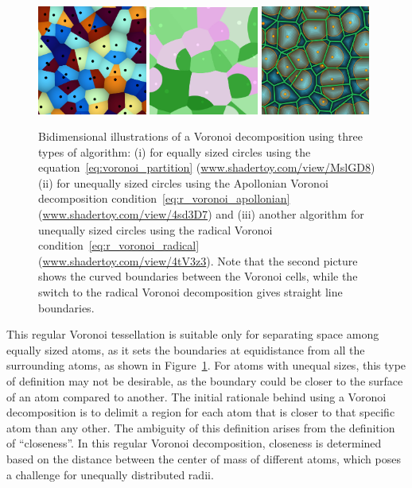 \documentclass[main]{subfiles}
\begin{document}
\begin{figure}[ht]
  \centering
  \includegraphics[width=0.32\textwidth]{figures/3-fastsim/voronoi.jpg}
  \hfill
  \includegraphics[width=0.32\textwidth]{figures/3-fastsim/voronoi_apollonian.jpg}
  \hfill
  \includegraphics[width=0.32\textwidth]{figures/3-fastsim/voronoi_radical.jpg}
  \caption{Bidimensional illustrations of a Voronoi decomposition using three types of algorithm: (i) for equally sized circles using the equation~\ref{eq:voronoi_partition} (\url{www.shadertoy.com/view/MslGD8}) (ii) for unequally sized circles using the Apollonian Voronoi decomposition condition~\ref{eq:r_voronoi_apollonian} (\url{www.shadertoy.com/view/4sd3D7}) and (iii) another algorithm for unequally sized circles using the radical Voronoi condition~\ref{eq:r_voronoi_radical} (\url{www.shadertoy.com/view/4tV3z3}). Note that the second picture shows the curved boundaries between the Voronoi cells, while the switch to the radical Voronoi decomposition gives straight line boundaries.}\label{fgr:voronoi_illustration}
\end{figure}

This regular Voronoi tessellation is suitable only for separating space among equally sized atoms, as it sets the boundaries at equidistance from all the surrounding atoms, as shown in Figure~\ref{fgr:voronoi_illustration}. For atoms with unequal sizes, this type of definition may not be desirable, as the boundary could be closer to the surface of an atom compared to another. The initial rationale behind using a Voronoi decomposition is to delimit a region for each atom that is closer to that specific atom than any other. The ambiguity of this definition arises from the definition of ``closeness''. In this regular Voronoi decomposition, closeness is determined based on the distance between the center of mass of different atoms, which poses a challenge for unequally distributed radii.
\end{document}
